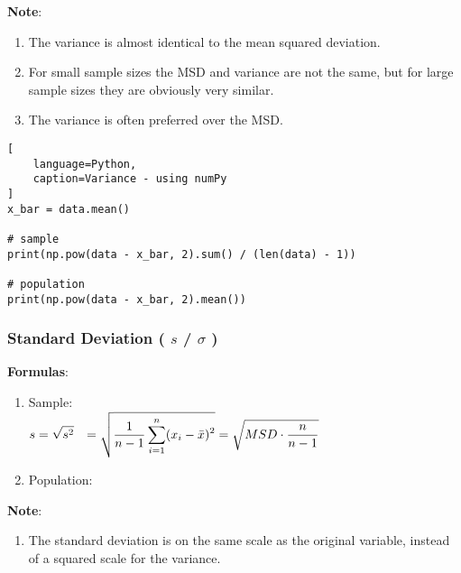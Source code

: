 \vspace{0.2cm}
\textbf{Note}:
\begin{enumerate}
    \item The variance is almost identical to the mean squared deviation. \hfill \cite{statistics/book/Statistics-for-Data-Scientists/Maurits-Kaptein}

    \item For small sample sizes the MSD and variance are not the same, but for large sample sizes they are obviously very similar. \hfill \cite{statistics/book/Statistics-for-Data-Scientists/Maurits-Kaptein}
    
    \item The variance is often preferred over the MSD. \hfill \cite{statistics/book/Statistics-for-Data-Scientists/Maurits-Kaptein}
\end{enumerate}


\begin{lstlisting}[
    language=Python, 
    caption=Variance - using numPy
]
x_bar = data.mean()

# sample
print(np.pow(data - x_bar, 2).sum() / (len(data) - 1))

# population
print(np.pow(data - x_bar, 2).mean())
\end{lstlisting}


\subsubsection{Standard Deviation ( $s$ / $\sigma$ ) \cite{statistics/book/Statistics-for-Data-Scientists/Maurits-Kaptein}} \label{Data/Describing Data/Central Tendency/Standard Deviation}

\textbf{Formulas}:
\begin{enumerate}
    \item Sample:
    \label{Data/Describing Data/Central Tendency/Standard Deviation/Sample} \\
        $
            \begin{aligned}
                s
                &=\sqrt{s^2} 
                &= \sqrt{\dfrac{1}{n-1} \displaystyle\sum_{i=1}^{n} (x_i - \bar{x})^2}
                &= \sqrt{MSD \cdot \dfrac{n}{n-1}}
            \end{aligned}
        $

    \item Population:
\end{enumerate}


\vspace{0.2cm}
\textbf{Note}:
\begin{enumerate}
    \item The standard deviation is on the same scale as the original variable, instead of a squared scale for the variance. \hfill \cite{statistics/book/Statistics-for-Data-Scientists/Maurits-Kaptein}

    
\end{enumerate}


